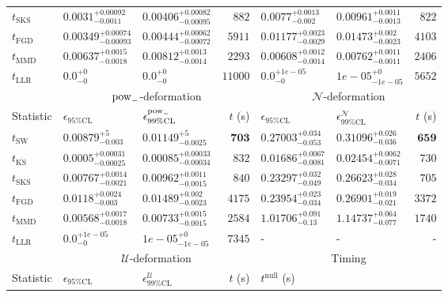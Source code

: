 \begin{tabular}{l|llr|llr}
	$t_{\mathrm{SKS}}$ & $0.0031_{-0.0011}^{+0.00092}$ & $0.00406_{-0.00095}^{+0.00082}$ & $882$ & $0.0077_{-0.002}^{+0.0013}$ & $0.00961_{-0.0013}^{+0.0011}$ & $822$ \\
	$t_{\mathrm{FGD}}$ & $0.00349_{-0.00093}^{+0.00074}$ & $0.00444_{-0.00072}^{+0.00062}$ & $5911$ & $0.01177_{-0.0029}^{+0.0023}$ & $0.01473_{-0.0023}^{+0.002}$ & $4103$ \\
	$t_{\mathrm{MMD}}$ & $0.00637_{-0.0018}^{+0.0015}$ & $0.00812_{-0.0014}^{+0.0013}$ & $2293$ & $0.00608_{-0.0014}^{+0.0012}$ & $0.00762_{-0.0011}^{+0.0011}$ & $2406$ \\
	$t_{\mathrm{LLR}}$ & $0.0_{-0}^{+0}$ & $0.0_{-0}^{+0}$ & $11000$ & $0.0_{-0}^{+1e-05}$ & $1e-05_{-1e-05}^{+0}$ & $5652$ \\
	\toprule
	\multicolumn{1}{c}{} & \multicolumn{3}{c}{$\rm{pow}_{-}$-deformation} & \multicolumn{3}{c}{$\mathcal{N}$-deformation} \\
	Statistic & $\epsilon_{95\%\mathrm{CL}}$ & $\epsilon^  {\rm{pow}_{-}}_{99\%\mathrm{CL}}$ & $t$ (s) & $\epsilon_{95\%\mathrm{CL}}$ & $\epsilon^    {\mathcal{N}}_{99\%\mathrm{CL}}$ & $t$ (s) \\
	\midrule
	$t_{\mathrm{SW}}$ & $0.00879_{-0.003}^{+5}$ & $0.01149_{-0.0025}^{+5}$ & ${\mathbf{703}}$ & $0.27003_{-0.053}^{+0.034}$ & $0.31096_{-0.036}^{+0.026}$ & ${\mathbf{659}}$ \\
	$t_{\overline{\mathrm{KS}}}$ & ${\mathbf{0.0005_{-0.00025}^{+0.00031}}}$ & ${\mathbf{0.00085_{-0.00034}^{+0.00033}}}$ & $832$ & ${\mathbf{0.01686_{-0.0081}^{+0.0067}}}$ & ${\mathbf{0.02454_{-0.0071}^{+0.0062}}}$ & $730$ \\
	$t_{\mathrm{SKS}}$ & $0.00767_{-0.0021}^{+0.0014}$ & $0.00962_{-0.0015}^{+0.0011}$ & $840$ & $0.23297_{-0.049}^{+0.032}$ & $0.26623_{-0.034}^{+0.028}$ & $705$ \\
	$t_{\mathrm{FGD}}$ & $0.0118_{-0.003}^{+0.0024}$ & $0.01489_{-0.0023}^{+0.002}$ & $4175$ & $0.23954_{-0.034}^{+0.023}$ & $0.26901_{-0.021}^{+0.019}$ & $3372$ \\
	$t_{\mathrm{MMD}}$ & $0.00568_{-0.0018}^{+0.0017}$ & $0.00733_{-0.0015}^{+0.0015}$ & $2584$ & $1.01706_{-0.13}^{+0.091}$ & $1.14737_{-0.077}^{+0.064}$ & $1740$ \\
	$t_{\mathrm{LLR}}$ & $0.0_{-0}^{+1e-05}$ & $1e-05_{-1e-05}^{+0}$ & $7345$ & - & - & - \\
	\toprule
	\multicolumn{1}{c}{} & \multicolumn{3}{c}{$\mathcal{U}$-deformation} & \multicolumn{3}{c}{Timing} \\
	Statistic & $\epsilon_{95\%\mathrm{CL}}$ & $\epsilon^    {\mathcal{U}}_{99\%\mathrm{CL}}$ & $t$ (s) & $t^{\mathrm{null}}$ (s) \\

\end{tabular}
